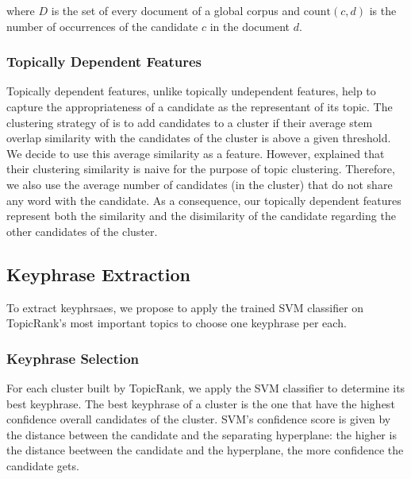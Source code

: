       \vspace{-1em}

      where $D$ is the set of every document of a global corpus and
      $\text{count}(c, d)$ is the number of occurrences of the candidate $c$ in
      the document $d$.

    \subsubsection{Topically Dependent Features}
    \label{subsubsec:topically_dependent_features}
      Topically dependent features, unlike topically undependent features, help
      to capture the appropriateness of a candidate as the representant of its
      topic. The clustering strategy of  is to
      add candidates to a cluster if their average stem overlap similarity with
      the candidates of the cluster is above a given threshold. We decide to
      use this average similarity as a feature. However,
       explained that their clustering similarity
      is naive for the purpose of topic clustering. Therefore, we also use the
      average number of candidates (in the cluster) that do not share any word
      with the candidate. As a consequence, our topically dependent features
      represent both the similarity and the disimilarity of the candidate
      regarding the other candidates of the cluster.

  \subsection{Keyphrase Extraction}
  \label{subsec:keyphrase_extraction}
    To extract keyphrsaes, we propose to apply the trained SVM classifier on
    TopicRank's most important topics to choose one keyphrase per each.

    \subsubsection{Keyphrase Selection}
    \label{subsubsec:keyphrase_selection}
      For each cluster built by TopicRank, we apply the SVM classifier to
      determine its best keyphrase. The best keyphrase of a cluster is the one
      that have the highest confidence overall candidates of the cluster. SVM's
      confidence score is given by the distance between the candidate and the
      separating hyperplane: the higher is the distance beetween the candidate
      and the hyperplane, the more confidence the candidate gets.

